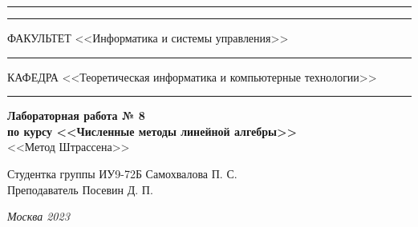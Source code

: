 \documentclass[a4paper, 14pt]{extarticle}
\begin{document}
\begin{titlepage}
\vspace{-25pt}
\hspace{-35pt}\rule{\textwidth}{2.3pt}

\vspace*{-20.3pt}
\hspace{-35pt}\rule{\textwidth}{0.4pt}

\vspace{1.5ex}
\hspace{-35pt} \noindent \small ФАКУЛЬТЕТ\hspace{80pt} <<Информатика и системы управления>>

\vspace*{-16pt}
\hspace{47pt}\rule{0.83\textwidth}{0.4pt}

\vspace{0.5ex}
\hspace{-35pt} \noindent \small КАФЕДРА\hspace{50pt} <<Теоретическая информатика и компьютерные технологии>>

\vspace*{-16pt}
\hspace{30pt}\rule{0.866\textwidth}{0.4pt}
  
\vspace{11em}

\begin{center}
\Large {\bf Лабораторная работа № 8} \\
\large {\bf по курсу <<Численные методы линейной алгебры>>} \\
\large <<Метод Штрассена>>
\end{center}\normalsize

\vspace{8em}


\begin{flushright}
  {Студентка группы ИУ9-72Б Самохвалова П. С. \hspace*{15pt}\\
  \vspace{2ex}
  Преподаватель Посевин Д. П.\hspace*{15pt}}
\end{flushright}

\bigskip

\vfill
 

\begin{center}
\textsl{Москва 2023}
\end{center}
\end{titlepage}
\end{document}
